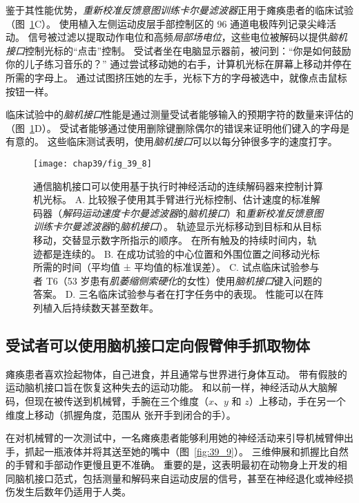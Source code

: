 鉴于其性能优势，\textit{重新校准反馈意图训练卡尔曼滤波器}正用于瘫痪患者的临床试验（图~\ref{fig:39_8}C）。
使用植入左侧运动皮层手部控制区的 96 通道电极阵列记录尖峰活动。
信号被过滤以提取动作电位和高频\textit{局部场电位}，这些电位被解码以提供\textit{脑机接口}控制光标的“点击”控制。
受试者坐在电脑显示器前，被问到：“你是如何鼓励你的儿子练习音乐的？” 通过尝试移动她的右手，计算机光标在屏幕上移动并停在所需的字母上。
通过试图挤压她的左手，光标下方的字母被选中，就像点击鼠标按钮一样。


临床试验中的\textit{脑机接口}性能是通过测量受试者能够输入的预期字符的数量来评估的（图~\ref{fig:39_8}D）。
受试者能够通过使用删除键删除偶尔的错误来证明他们键入的字母是有意的。
这些临床测试表明，使用\textit{脑机接口}可以以每分钟很多字的速度打字。


\begin{figure}[htbp]
	\centering
	\texttt{[image: chap39/fig\_39\_8]}
	\caption{通信脑机接口可以使用基于执行时神经活动的连续解码器来控制计算机光标。
		A. 比较猴子使用其手臂进行光标控制、估计速度的标准解码器（\textit{解码运动速度卡尔曼滤波器}的\textit{脑机接口}）和\textit{重新校准反馈意图训练卡尔曼滤波器}的\textit{脑机接口}）。
		轨迹显示光标移动到目标和从目标移动，交替显示数字所指示的顺序。
		在所有触及的持续时间内，轨迹都是连续的\cite{gilja2012high}。
		B. 在成功试验的中心位置和外围位置之间移动光标所需的时间（平均值 ± 平均值的标准误差）\cite{gilja2012high}。 
		C. 试点临床试验参与者 T6（53 岁患有\textit{肌萎缩侧索硬化}的女性）使用\textit{脑机接口}键入问题的答案\cite{pandarinath2017high}。
		D. 三名临床试验参与者在打字任务中的表现。
		性能可以在阵列植入后持续数天甚至数年\cite{pandarinath2017high}。}
	\label{fig:39_8}
\end{figure}



\subsection{受试者可以使用脑机接口定向假臂伸手抓取物体}

瘫痪患者喜欢捡起物体，自己进食，并且通常与世界进行身体互动。
带有假肢的运动脑机接口旨在恢复这种失去的运动功能。
和以前一样，神经活动从大脑解码，但现在被传送到机械臂，手腕在三个维度（$ x $、$ y $ 和 $ z $）上移动，手在另一个维度上移动（抓握角度，范围从 张开手到闭合的手）。


在对机械臂的一次测试中，一名瘫痪患者能够利用她的神经活动来引导机械臂伸出手，抓起一瓶液体并将其送至她的嘴中（图~\ref{fig:39_9}）。
三维伸展和抓握比自然的手臂和手部动作更慢且更不准确。
重要的是，这表明最初在动物身上开发的相同脑机接口范式，包括测量和解码来自运动皮层的信号，甚至在神经退化或神经损伤发生后数年仍适用于人类。


